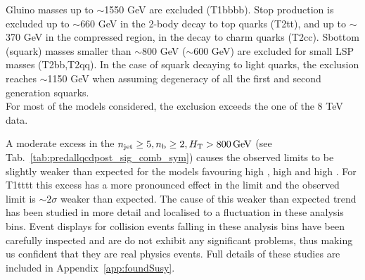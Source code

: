 \newpage
Gluino masses up to $\sim$1550 GeV are excluded (T1bbbb). 
Stop production is excluded up to $\sim$660 GeV in the 2-body decay to top quarks (T2tt), 
and up to $\sim$370 GeV in the compressed region, in the decay to charm quarks (T2cc). 
Sbottom (squark) masses smaller than $\sim$800 GeV ($\sim$600 GeV) are excluded for small LSP masses (T2bb,T2qq). 
In the case of squark decaying to light quarks, the exclusion reaches $\sim$1150 GeV when assuming degeneracy of 
all the first and second generation squarks. \\
For most of the models considered, the exclusion exceeds the one of the 8 TeV data. 

A moderate excess in the $n_{\text{jet}}\geq5, n_{\text{b}}\geq2, \mbox{$H_\text{T}$} > 800 \, \mathrm{GeV}$ (see Tab.~\ref{tab:predallqcdpost_sig_comb_sym})
causes the observed limits to be slightly weaker than expected for the models favouring high \nb, high \nj and high \scalht. 
For T1tttt this excess has a more pronounced effect in the limit and the observed limit is $\sim 2\sigma$ 
weaker than expected. The cause of this weaker than expected trend has been studied in more detail
and localised to a fluctuation in these analysis bins. Event displays for collision events 
falling in these analysis bins have been carefully inspected and are do not exhibit any 
significant problems, thus making us confident that they are real physics events. Full details
of these studies are included in Appendix~\ref{app:foundSusy}.





